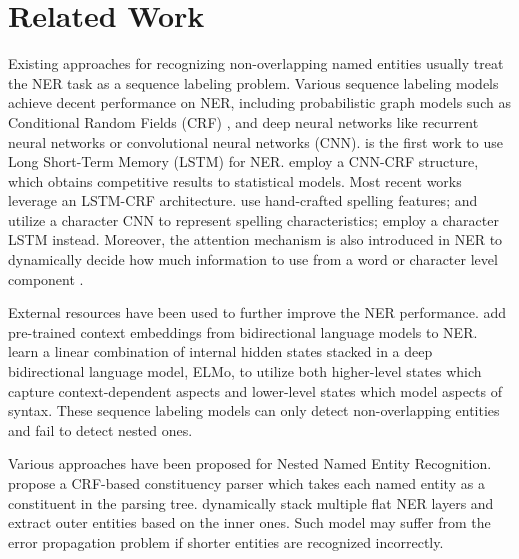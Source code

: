\documentclass[11pt,a4paper]{article}
\begin{document}
\section{Related Work}
Existing approaches for recognizing non-overlapping named entities usually treat the NER task as a sequence labeling problem. Various sequence labeling models achieve decent performance on NER, 
including probabilistic graph models such as Conditional Random Fields (CRF) \cite{ratinov2009design}, and deep neural networks like recurrent neural networks or convolutional neural networks (CNN). \citet{hammerton2003named} is the first work to use Long Short-Term Memory (LSTM) for NER.
\citet{collobert2011natural} employ a CNN-CRF structure, which obtains competitive results to statistical models. 
Most recent works leverage an LSTM-CRF architecture.
\citet{huang2015bidirectional} use hand-crafted spelling features; \citet{ma2016end} and \citet{chiu2016named} utilize a character CNN to represent spelling characteristics; \citet{lample2016neural} employ a character LSTM instead. Moreover, the attention mechanism is also introduced in NER to dynamically decide how much information to use from a word or character level component \cite{rei2016attending}.

External resources have been used to further improve the NER performance.
\citet{peters2017semi} add pre-trained context embeddings from bidirectional language models to NER.
\citet{peters2018deep} learn a linear combination of internal hidden states stacked in a deep bidirectional language model, ELMo, to utilize both higher-level states which capture context-dependent aspects and lower-level states which model aspects of syntax. 
These sequence labeling models can only detect non-overlapping entities and fail to detect nested ones.

Various approaches have been proposed for Nested Named Entity Recognition.
\citet{finkel2009nested} propose a CRF-based constituency parser which takes each named entity as a constituent in the parsing tree.
\citet{ju2018neural} dynamically stack multiple flat NER layers and extract outer entities based on the inner ones. Such model may suffer from the error propagation problem if shorter entities are recognized incorrectly.
\end{document}

